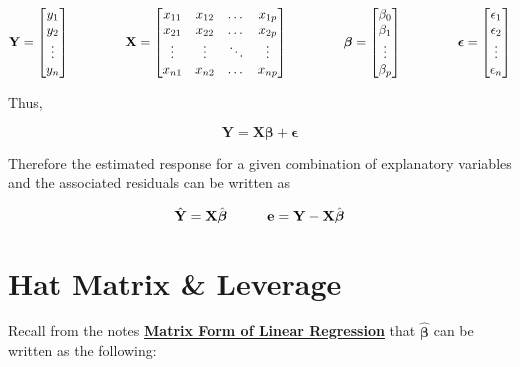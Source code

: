\documentclass[]{book}
\begin{document}
\begin{equation}
\label{matrix notation}
\mathbf{Y} = \begin{bmatrix}y_1 \\ y_2 \\ \vdots \\y_n\end{bmatrix} 
\hspace{15mm}
\mathbf{X} = \begin{bmatrix}x_{11} & x_{12} & \dots & x_{1p} \\
x_{21} & x_{22} & \dots & x_{2p} \\
\vdots & \vdots & \ddots & \vdots\\
x_{n1} & x_{n2} & \dots & x_{np} \end{bmatrix}
\hspace{15mm}
\boldsymbol{\beta}= \begin{bmatrix}\beta_0 \\ \beta_1 \\ \vdots \\ \beta_p \end{bmatrix} 
\hspace{15mm}
\boldsymbol{\epsilon}= \begin{bmatrix}\epsilon_1 \\ \epsilon_2 \\ \vdots \\ \epsilon_n \end{bmatrix}
\end{equation}

Thus,

\[\mathbf{Y} = \mathbf{X}\boldsymbol{\beta} + \mathbf{\epsilon}\]

Therefore the estimated response for a given combination of explanatory
variables and the associated residuals can be written as

\begin{equation}
\label{matrix_mean}
\hat{\mathbf{Y}} = \mathbf{X}\hat{\boldsymbol{\beta}} \hspace{10mm} \mathbf{e} = \mathbf{Y} - \mathbf{X}\hat{\boldsymbol{\beta}}
\end{equation}

\section{Hat Matrix \& Leverage}\label{hat-matrix-leverage}

Recall from the notes
\href{https://github.com/STA210-Sp19/supplemental-notes/blob/master/regression-basics-matrix.pdf}{\textbf{Matrix
Form of Linear Regression}} that \(\hat{\boldsymbol{\beta}}\) can be
written as the following:
\end{document}

